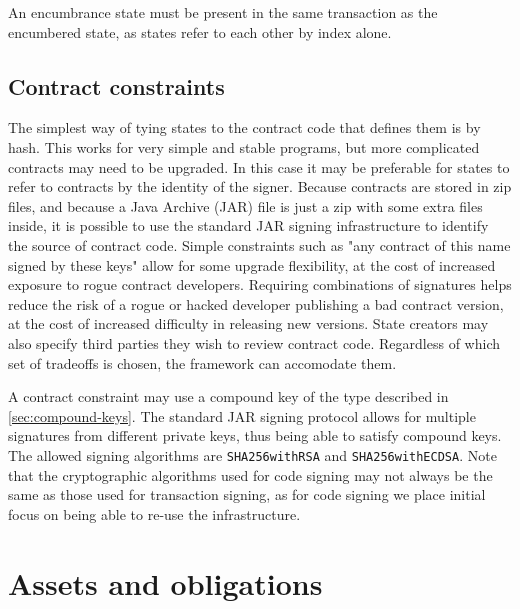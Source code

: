 \documentclass{article}
\begin{document}

An encumbrance state must be present in the same transaction as the encumbered state, as states refer to each other
by index alone.


\subsection{Contract constraints}\label{sec:contract-constraints}

The simplest way of tying states to the contract code that defines them is by hash. This works for very simple
and stable programs, but more complicated contracts may need to be upgraded. In this case it may be preferable
for states to refer to contracts by the identity of the signer. Because contracts are stored in zip files, and
because a Java Archive (JAR) file is just a zip with some extra files inside, it is possible to use the standard
JAR signing infrastructure to identify the source of contract code. Simple constraints such as "any contract of
this name signed by these keys" allow for some upgrade flexibility, at the cost of increased exposure to rogue
contract developers. Requiring combinations of signatures helps reduce the risk of a rogue or hacked developer
publishing a bad contract version, at the cost of increased difficulty in releasing new versions. State creators
may also specify third parties they wish to review contract code. Regardless of which set of tradeoffs is chosen,
the framework can accomodate them.

A contract constraint may use a compound key of the type described in \cref{sec:compound-keys}. The standard JAR
signing protocol allows for multiple signatures from different private keys, thus being able to satisfy compound
keys. The allowed signing algorithms are \texttt{SHA256withRSA} and \texttt{SHA256withECDSA}. Note that the
cryptographic algorithms used for code signing may not always be the same as those used for transaction signing,
as for code signing we place initial focus on being able to re-use the infrastructure.


\section{Assets and obligations}
\end{document}
